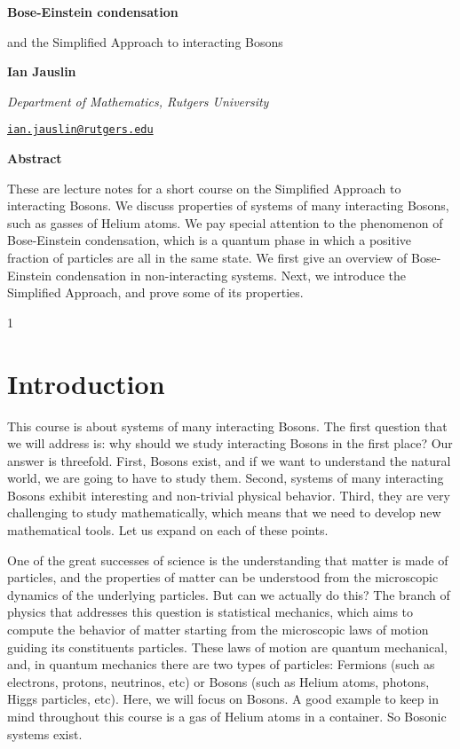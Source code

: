 \documentclass{ian}
\begin{document}
\pagestyle{empty}

\hbox{}
\hfil{\bf\LARGE
Bose-Einstein condensation\par
\vskip10pt
\hfil and the Simplified Approach to interacting Bosons
}
\vskip20pt

\hfil{\bf\large Ian Jauslin}\par
\hfil{\it Department of Mathematics, Rutgers University}\par
\hfil{\tt\color{blue}\href{mailto:ian.jauslin@rutgers.edu}{ian.jauslin@rutgers.edu}}\par
\vskip20pt


\hfil {\bf Abstract}\par
\medskip

These are lecture notes for a short course on the Simplified Approach to interacting Bosons.
We discuss properties of systems of many interacting Bosons, such as gasses of Helium atoms.
We pay special attention to the phenomenon of Bose-Einstein condensation, which is a quantum phase in which a positive fraction of particles are all in the same state.
We first give an overview of Bose-Einstein condensation in non-interacting systems.
Next, we introduce the Simplified Approach, and prove some of its properties.
\vskip20pt

\tableofcontents

\vskip40pt

\setcounter{page}1
\pagestyle{plain}

\section{Introduction}
\indent
This course is about systems of many interacting Bosons.
The first question that we will address is: why should we study interacting Bosons in the first place?
Our answer is threefold.
First, Bosons exist, and if we want to understand the natural world, we are going to have to study them.
Second, systems of many interacting Bosons exhibit interesting and non-trivial physical behavior.
Third, they are very challenging to study mathematically, which means that we need to develop new mathematical tools.
Let us expand on each of these points.
\bigskip

\point
One of the great successes of science is the understanding that matter is made of particles, and the properties of matter can be understood from the microscopic dynamics of the underlying particles.
But can we actually do this?
The branch of physics that addresses this question is statistical mechanics, which aims to compute the behavior of matter starting from the microscopic laws of motion guiding its constituents particles.
These laws of motion are quantum mechanical, and, in quantum mechanics there are two types of particles: Fermions (such as electrons, protons, neutrinos, etc) or Bosons (such as Helium atoms, photons, Higgs particles, etc).
Here, we will focus on Bosons.
A good example to keep in mind throughout this course is a gas of Helium atoms in a container.
So Bosonic systems exist.
\bigskip
\end{document}
